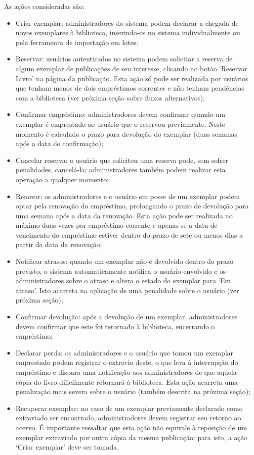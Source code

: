 \documentclass[a4paper]{article}
\begin{document}
As ações consideradas são:
\begin{itemize}
\item Criar exemplar: administradores do sistema podem declarar a chegada de novos exemplares à biblioteca, inserindo-os no sistema individualmente ou pela ferramenta de importação em lotes;
\item Reservar: usuários autenticados no sistema podem solicitar a reserva de algum exemplar de publicações de seu interesse, clicando no botão ‘Reservar Livro’ na página da publicação. Esta ação só pode ser realizada por usuários que tenham menos de dois empréstimos correntes e não tenham pendências com a biblioteca (ver próxima seção sobre fluxos alternativos);
\item Confirmar empréstimo: administradores devem confirmar quando um exemplar é emprestado ao usuário que o reservou previamente. Neste momento é calculado o prazo para devolução do exemplar (duas semanas após a data de confirmação);
\item Cancelar reserva: o usuário que solicitou uma reserva pode, sem sofrer penalidades, cancelá-la; administradores também podem realizar esta operação a qualquer momento;
\item Renovar: os administradores e o usuário em posse de um exemplar podem optar pela renovação do empréstimo, prolongando o prazo de devolução para uma semana após a data da renovação. Esta ação pode ser realizada no máximo duas vezes por empréstimo corrente e apenas se a data de vencimento do empréstimo estiver dentro do prazo de sete ou menos dias a partir da data da renovação;
\item Notificar atrasos: quando um exemplar não é devolvido dentro do prazo previsto, o sistema automaticamente notifica o usuário envolvido e os administradores sobre o atraso e altera o estado do exemplar para ‘Em atraso’. Isto acarreta na aplicação de uma penalidade sobre o usuário (ver próxima seção);
\item Confirmar devolução: após a devolução de um exemplar, administradores devem confirmar que este foi retornado à biblioteca, encerrando o empréstimo;
\item Declarar perda: os administradores e o usuário que tomou um exemplar emprestado podem registrar o extravio deste, o que leva à interrupção do empréstimo e dispara uma notificação aos administradores de que aquela cópia do livro dificilmente retornará à biblioteca. Esta ação acarreta uma penalização mais severa sobre o usuário (também descrita na próxima seção);
\item Recuperar exemplar: no caso de um exemplar previamente declarado como extraviado ser encontrado, administradores devem registrar seu retorno ao acervo. É importante ressaltar que esta ação não equivale à reposição de um exemplar extraviado por outra cópia da mesma publicação: para isto, a ação ‘Criar exemplar’ deve ser tomada.
\end{itemize}
\end{document}
